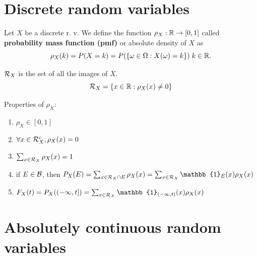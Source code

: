 \section{Discrete random variables}
\begin{definition}
    Let $X$ be a discrete r. v. We define the function $\rho_X:\mathbb{R}\to[0,1]$ called \textbf{probability mass function (pmf)} or absolute density of $X$ as
    \begin{equation*}
        \rho_X(k)=P(X=k)=P(\{\omega \in \Omega:X(\omega)=k\}) \; k\in\mathbb{R}.
    \end{equation*}
\end{definition}
\begin{definition}
    $\mathcal{R}_X$ is the set of all the images of $X$.
    \begin{equation*}
        \mathcal{R}_X=\{x \in \mathbb{R}: \rho_X(x)\ne 0\}
    \end{equation*}
\end{definition}
Properties of $\rho_X$:
\begin{enumerate}
    \item $\rho_X \in [0, 1]$
    \item $\forall x \in \mathcal{R}_X^c, \rho_X(x)=0$
    \item $\sum_{x \in \mathcal{R}_X}\rho_X(x)=1 $
    \item if $E \in \mathcal{B}$, then $P_X(E)=\sum_{x \in \calR_X\cap E}\rho_X(x)=\sum_{x \in \calR_X}\mathbb{1}_E(x)\rho_X(x)$
    \item $F_X(t)=P_X((-\infty,t])=\sum_{x \in \calR_X}\mathbb{1}_{(-\infty, t)}(x)\rho_X(x)$
\end{enumerate}
\section{Absolutely continuous random variables}
